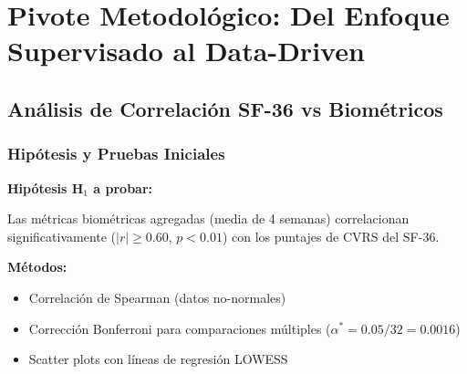 \documentclass[12pt,letterpaper,twoside]{report}
\begin{document}
\chapter{Pivote Metodológico: Del Enfoque Supervisado al Data-Driven}

\section{Análisis de Correlación SF-36 vs Biométricos}

\subsection{Hipótesis y Pruebas Iniciales}

\begin{hipotesisbox}
\textbf{Hipótesis H$_1$ a probar:}

Las métricas biométricas agregadas (media de 4 semanas) correlacionan significativamente ($|r| \geq 0.60$, $p<0.01$) con los puntajes de CVRS del SF-36.
\end{hipotesisbox}

\begin{estadisticobox}
\textbf{Métodos:}

\begin{itemize}[noitemsep]
    \item Correlación de Spearman (datos no-normales)
    \item Corrección Bonferroni para comparaciones múltiples ($\alpha^* = 0.05 / 32 = 0.0016$)
    \item Scatter plots con líneas de regresión LOWESS
\end{itemize}
\end{estadisticobox}

\begin{table}[H]
\centering
\caption{Matriz de Correlación: Biométricos Agregados vs SF-36 ($N=10$)}
\label{tab:correlation_sf36}
\end{table}
\end{document}
